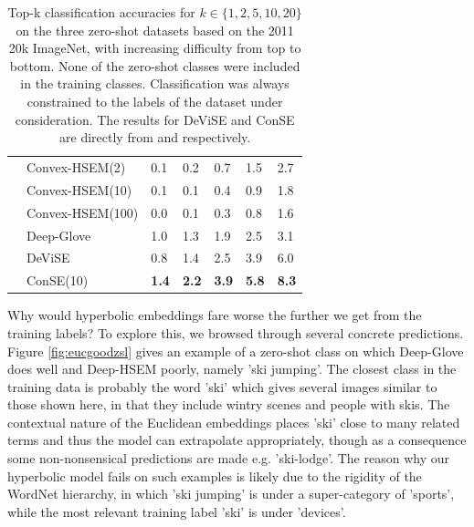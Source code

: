 \documentclass[12pt]{report}
\begin{document}
\begin{table}[]
\begin{tabular}{cllllll}
  \multicolumn{1}{l}{} & Convex-HSEM(2) & 0.1 & 0.2 & 0.7 & 1.5 & 2.7 \\
  \multicolumn{1}{l}{} & Convex-HSEM(10) & 0.1 & 0.1 & 0.4 & 0.9 & 1.8 \\
  \multicolumn{1}{l}{} & Convex-HSEM(100) & 0.0 & 0.1 & 0.3 & 0.8 & 1.6 \\
  \multicolumn{1}{l}{} & Deep-Glove & 1.0 & 1.3  & 1.9 & 2.5 & 3.1 \\
  \multicolumn{1}{l}{} & DeViSE & 0.8 & 1.4 & 2.5 & 3.9 & 6.0 \\
  \multicolumn{1}{l}{} & ConSE(10) & \textbf{1.4} & \textbf{2.2} & \textbf{3.9} & \textbf{5.8} & \textbf{8.3} \\ \hline
\end{tabular}
\caption{Top-k classification accuracies for $k \in \{1, 2, 5, 10, 20 \}$ on the three zero-shot datasets based on the 2011 20k ImageNet, with increasing difficulty from top to bottom. None of the zero-shot classes were included in the training classes. Classification was always constrained to the labels of the dataset under consideration. The results for DeViSE and ConSE are directly from \cite{Frome2013} and \cite{Norouzi2013} respectively.}
\label{tbl:zslres}
\end{table}

Why would hyperbolic embeddings fare worse the further we get from the training labels? To explore this, we browsed through several concrete predictions. Figure \ref{fig:eucgoodzsl} gives an example of a zero-shot class on which Deep-Glove does well and Deep-HSEM poorly, namely 'ski jumping'. The closest class in the training data is probably the word 'ski' which gives several images similar to those shown here, in that they include wintry scenes and people with skis. The contextual nature of the Euclidean embeddings places 'ski' close to many related terms and thus the model can extrapolate appropriately, though as a consequence some non-nonsensical predictions are made e.g. 'ski-lodge'. The reason why our hyperbolic model fails on such examples is likely due to the rigidity of the WordNet hierarchy, in which 'ski jumping' is under a super-category of 'sports', while the most relevant training label 'ski' is under 'devices'. 
\end{document}
